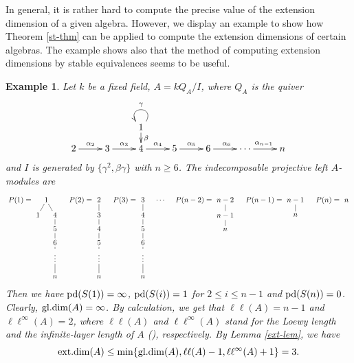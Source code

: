 \documentclass[12pt]{article}
\numberwithin{equation}{section}
\newtheorem{Bsp}[Def]{Example}%
\theoremstyle{definition}
\newcommand{\gd}{{\rm gl.dim }}
\def\ed{\mathop{\rm ext.dim}\nolimits}
\newcommand{\pd}{{\rm pd}}
\begin{document}
\medskip
In general, it is rather hard to compute the precise value of the extension dimension of a given algebra. However, we display an example to show how Theorem \ref{st-thm} can be applied to compute the extension dimensions of certain algebras. The example shows also that the method of computing extension dimensions by stable equivalences seems to be useful.
\begin{Bsp}{\rm
Let $k$ be a fixed field, $A=kQ_A/I$, where $Q_A$ is the quiver
$$\xymatrix@R=10pt{
&&1\ar[d]^{\beta}\ar@(ur,ul)_{\gamma}&&&&\\
2\ar[r]^{\alpha_2}
&3\ar[r]^{\alpha_3}
&4\ar[r]^{\alpha_4}
&5\ar[r]^{\alpha_5}
&6\ar[r]^{\alpha_6}
&\cdots \ar[r]^{\alpha_{n-1}}
&n
}$$
and $I$ is generated by $\{\gamma^2, \beta\gamma\}$ with $n\ge 6$.
The indecomposable projective left $A$-modules are
$$
\xymatrix@R=.23cm@C=.01cm{
P(1)=&&1\ar@{-}[dl]\ar@{-}[dr]&\\
&1&&4\ar@{-}[d]\\
&&&5\ar@{-}[d]\\
&&&6\ar@{-}[d]\\
&&&\vdots\ar@{-}[d]\\
&&&n}\quad
\xymatrix@R=.23cm@C=.01cm{
P(2)=&2\ar@{-}[d]\\
&3\ar@{-}[d]\\
&4\ar@{-}[d]\\
&5\ar@{-}[d]\\
&\vdots\ar@{-}[d]\\
&n}\quad
\xymatrix@R=.23cm@C=.01cm{
P(3)=&3\ar@{-}[d]\\
&4\ar@{-}[d]\\
&5\ar@{-}[d]\\
&6\ar@{-}[d]\\
&\vdots\ar@{-}[d]\\
&n}\quad
\cdots\quad
\xymatrix@R=.23cm@C=.01cm{
P(n-2)=&n-2\ar@{-}[d]\\
&n-1\ar@{-}[d]\\
&n}
\quad
\xymatrix@R=.23cm@C=.01cm{
P(n-1)=&n-1\ar@{-}[d]\\
&n}
\quad
\xymatrix@R=.23cm@C=.01cm{
P(n)=&n
}$$
Then we have $\pd(S(1))=\infty$, $\pd(S(i))=1$ for $2\le i\le n-1$ and $\pd(S(n))=0$. Clearly, $\gd(A)=\infty$.
By calculation, we get that $\ell\ell(A)=n-1$ and $\ell\ell^{\infty}(A)=2$, where $\ell\ell(A)$ and $\ell\ell^{\infty}(A)$ stand for the Loewy length and the infinite-layer length of $A$ {\rm(\cite{hlh09,hlh13})}, respectively. By Lemma \ref{ext-lem}, we have $$\ed(A)\le \min\{\gd(A),\ell\ell(A)-1,\ell\ell^{\infty}(A)+1\}=3.$$

}
\end{Bsp}
\end{document}

